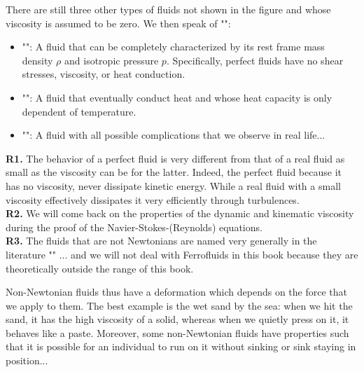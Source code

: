 	There are still three other types of fluids not shown in the figure and whose viscosity is assumed to be zero. We then speak of "":
	\begin{itemize}
		\item "":  A fluid that can be completely characterized by its rest frame mass density $\rho$ and isotropic pressure $p$. Specifically, perfect fluids have no shear stresses, viscosity, or heat conduction.
		
		\item "": A fluid that eventually conduct heat and whose heat capacity is only dependent of temperature.
		
		\item "": A fluid with all possible complications that we observe in real life...
	\end{itemize}
	\begin{tcolorbox}[title=Remarks,colframe=black,arc=10pt]
	\textbf{R1.} The behavior of a perfect fluid is very different from that of a real fluid as small as the viscosity can be for the latter. Indeed, the perfect fluid because it has no viscosity, never dissipate kinetic energy. While a real fluid with a small viscosity effectively dissipates it very efficiently through turbulences.\\
	
	\textbf{R2.} We will come back on the properties of the dynamic and kinematic viscosity during the proof of the Navier-Stokes-(Reynolds) equations.\\
	
	\textbf{R3.} The fluids that are not Newtonians are named very generally in the literature "" ... and we will not deal with Ferrofluids in this book because they are theoretically outside the range of this book.
	\end{tcolorbox}
	Non-Newtonian fluids thus have a deformation which depends on the force that we apply to them. The best example is the wet sand by the sea: when we hit the sand, it has the high viscosity of a solid, whereas when we quietly press on it, it behaves like a paste. Moreover, some non-Newtonian fluids have properties such that it is possible for an individual to run on it without sinking or sink staying in position...
	
	\pagebreak
